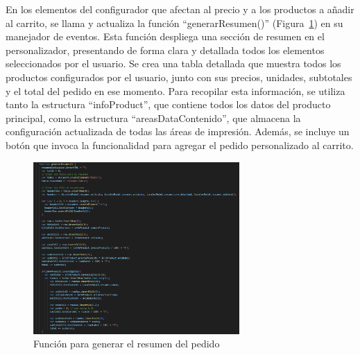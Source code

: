 \documentclass[11pt]{article}
\begin{document}
En los elementos del configurador que afectan al precio y a los productos a añadir al carrito, se llama y actualiza la función ``generarResumen()'' (Figura~\ref{fig:resumen1}) 
en su manejador de eventos. Esta función despliega una sección de resumen en el personalizador, presentando de forma clara y detallada todos 
los elementos seleccionados por el usuario. Se crea una tabla detallada que muestra todos los productos configurados por el usuario, junto con sus precios,
unidades, subtotales y el total del pedido en ese momento. Para recopilar esta información, se utiliza tanto la estructura ``infoProduct'', 
que contiene todos los datos del producto principal, como la estructura ``areasDataContenido'', que almacena la configuración actualizada 
de todas las áreas de impresión. Además, se incluye un botón que invoca la funcionalidad para agregar el pedido personalizado al carrito.

\begin{figure}[H]
    \centering
    \includegraphics[width=0.7\textwidth]{imagenesUS3-modal/generarResumen.png}
    \caption{\label{fig:resumen1} Función para generar el resumen del pedido}
    \vspace{\fill}
\end{figure}
\end{document}
